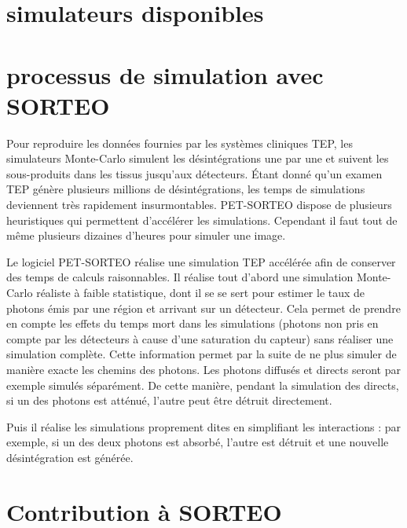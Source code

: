	\section{simulateurs disponibles}

	\section{processus de simulation avec SORTEO}

Pour reproduire les données fournies par les systèmes cliniques TEP, les simulateurs Monte-Carlo simulent les désintégrations une par une et suivent les sous-produits dans les tissus jusqu'aux détecteurs. Étant donné qu'un examen TEP génère plusieurs millions de désintégrations, les temps de simulations deviennent très rapidement insurmontables. PET-SORTEO dispose de plusieurs heuristiques qui permettent d'accélérer les simulations. Cependant il faut tout de même plusieurs dizaines d'heures pour simuler une image.

Le logiciel PET-SORTEO réalise une simulation TEP accélérée afin de conserver des temps de calculs raisonnables. Il réalise tout d'abord une simulation Monte-Carlo réaliste à faible statistique, dont il se se sert pour estimer le taux de photons émis par une région et arrivant sur un détecteur. Cela permet de prendre en compte les effets du temps mort dans les simulations (photons non pris en compte par les détecteurs à cause d'une saturation du capteur) sans réaliser une simulation complète. Cette information permet par la suite de ne plus simuler de manière exacte les chemins des photons. Les photons diffusés et directs seront par exemple simulés séparément. De cette manière, pendant la simulation des directs, si un des photons est atténué, l'autre peut être détruit directement.

Puis il réalise les simulations proprement dites en simplifiant les interactions : par exemple, si un des deux photons est absorbé, l'autre est détruit et une nouvelle désintégration est générée.

	\section{Contribution à SORTEO}

